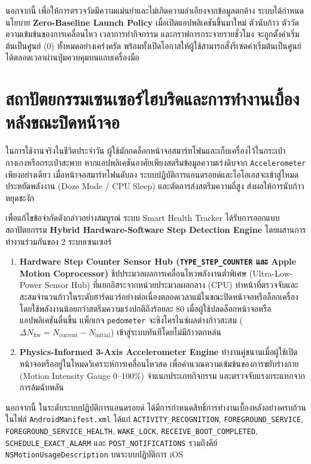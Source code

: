 นอกจากนี้ เพื่อให้การตรวจวัดมีความแม่นยำและไม่เกิดความลำเอียงจากข้อมูลตกค้าง ระบบได้กำหนดนโยบาย \textbf{Zero-Baseline Launch Policy} เมื่อเปิดแอปพลิเคชันขึ้นมาใหม่ ตัวนับก้าว ตัววัดความเข้มข้นของการเคลื่อนไหว เวลาการทำกิจกรรม และกราฟการกระจายรายชั่วโมง จะถูกตั้งค่าเริ่มต้นเป็นศูนย์ ($0$) ทั้งหมดอย่างเคร่งครัด พร้อมทั้งเปิดโอกาสให้ผู้ใช้สามารถสั่งรีเซตค่าเริ่มต้นเป็นศูนย์ได้ตลอดเวลาผ่านปุ่มควบคุมบนแถบเครื่องมือ

\section{สถาปัตยกรรมเซนเซอร์ไฮบริดและการทำงานเบื้องหลังขณะปิดหน้าจอ}
ในการใช้งานจริงในชีวิตประจำวัน ผู้ใช้มักกดล็อกหน้าจอสมาร์ทโฟนและเก็บเครื่องไว้ในกระเป๋ากางเกงหรือกระเป๋าสะพาย หากแอปพลิเคชันอาศัยเพียงสตรีมข้อมูลความเร่งดิบจาก \texttt{Accelerometer} เพียงอย่างเดียว เมื่อหน้าจอสมาร์ทโฟนดับลง ระบบปฏิบัติการแอนดรอยด์และไอโอเอสจะเข้าสู่โหมดประหยัดพลังงาน (Doze Mode / CPU Sleep) และตัดการส่งสตรีมความถี่สูง ส่งผลให้การนับก้าวหยุดชะงัก

เพื่อแก้ไขข้อจำกัดดังกล่าวอย่างสมบูรณ์ ระบบ Smart Health Tracker ได้รับการออกแบบสถาปัตยกรรม \textbf{Hybrid Hardware-Software Step Detection Engine} โดยผสานการทำงานร่วมกันของ 2 ระบบเซนเซอร์
\begin{enumerate}
    \item \textbf{Hardware Step Counter Sensor Hub (\texttt{TYPE\_STEP\_COUNTER} และ Apple Motion Coprocessor)} ชิปประมวลผลการเคลื่อนไหวพลังงานต่ำพิเศษ (Ultra-Low-Power Sensor Hub) ที่แยกอิสระจากหน่วยประมวลผลกลาง (CPU) ทำหน้าที่ตรวจจับและสะสมจำนวนก้าวในระดับฮาร์ดแวร์อย่างต่อเนื่องตลอดเวลาแม้ในขณะปิดหน้าจอหรือล็อกเครื่อง โดยใช้พลังงานน้อยกว่าสตรีมความเร่งปกติถึงร้อยละ 80 เมื่อผู้ใช้ปลดล็อกหน้าจอหรือแอปพลิเคชันตื่นขึ้น แพ็กเกจ \texttt{pedometer} จะซิงโครไนซ์ผลต่างก้าวสะสม ($\Delta N_{\text{hw}} = N_{\text{current}} - N_{\text{initial}}$) เข้าสู่ระบบทันทีโดยไม่มีก้าวตกหล่น
    \item \textbf{Physics-Informed 3-Axis Accelerometer Engine} ทำงานคู่ขนานเมื่อผู้ใช้เปิดหน้าจอหรืออยู่ในโหมดวิเคราะห์การเคลื่อนไหวสด เพื่อคำนวณความเข้มข้นของการขยับร่างกาย (Motion Intensity Gauge 0--100\%) จำแนกประเภทกิจกรรม และตรวจจับแรงกระแทกจากการล้มฉับพลัน
\end{enumerate}

นอกจากนี้ ในระดับระบบปฏิบัติการแอนดรอยด์ ได้มีการกำหนดสิทธิ์การทำงานเบื้องหลังอย่างครบถ้วนในไฟล์ \texttt{AndroidManifest.xml} ได้แก่ \texttt{ACTIVITY\_RECOGNITION}, \texttt{FOREGROUND\_SERVICE}, \texttt{FOREGROUND\_SERVICE\_HEALTH}, \texttt{WAKE\_LOCK}, \texttt{RECEIVE\_BOOT\_COMPLETED}, \texttt{SCHEDULE\_EXACT\_ALARM} และ \texttt{POST\_NOTIFICATIONS} รวมถึงคีย์ \texttt{NSMotionUsageDescription} บนระบบปฏิบัติการ iOS

